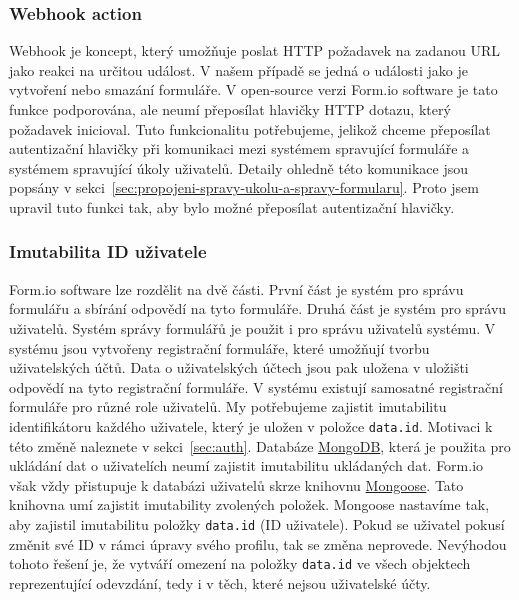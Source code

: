\subsubsection{Webhook action}\label{subsubsec:webhook-action}

Webhook je koncept, který umožňuje poslat HTTP požadavek na zadanou URL jako reakci na určitou událost.
V našem případě se jedná o události jako je vytvoření nebo smazání formuláře.
V open-source verzi Form.io software je tato funkce podporována, ale neumí přeposílat hlavičky HTTP dotazu, který požadavek inicioval.
Tuto funkcionalitu potřebujeme, jelikož chceme přeposílat autentizační hlavičky při komunikaci mezi systémem spravující formuláře a systémem spravující úkoly uživatelů.
Detaily ohledně této komunikace jsou popsány v sekci~\ref{sec:propojeni-spravy-ukolu-a-spravy-formularu}.
Proto jsem upravil tuto funkci tak, aby bylo možné přeposílat autentizační hlavičky.

\subsubsection{Imutabilita ID uživatele}\label{subsubsec:imutabilita-id-uzivatele}

Form.io software lze rozdělit na dvě části.
První část je systém pro správu formulářu a sbírání odpovědí na tyto formuláře.
Druhá část je systém pro správu uživatelů.
Systém správy formulářů je použit i pro správu uživatelů systému.
V systému jsou vytvořeny registrační formuláře, které umožňují tvorbu uživatelských účtů.
Data o uživatelských účtech jsou pak uložena v uložišti odpovědí na tyto registrační formuláře.
V systému existují samosatné registrační formuláře pro různé role uživatelů.
My potřebujeme zajistit imutabilitu identifikátoru každého uživatele, který je uložen v položce \lstinline{data.id}.
Motivaci k této změně naleznete v sekci~\ref{sec:auth}.
Databáze \href{https://www.mongodb.com/}{MongoDB}, která je použita pro ukládání dat o uživatelích neumí zajistit imutabilitu ukládaných dat.
Form.io však vždy přistupuje k databázi uživatelů skrze knihovnu \href{https://mongoosejs.com/}{Mongoose}.
Tato knihovna umí zajistit imutability zvolených položek.
Mongoose nastavíme tak, aby zajistil imutabilitu položky \lstinline{data.id} (ID uživatele).
Pokud se uživatel pokusí změnit své ID v rámci úpravy svého profilu, tak se změna neprovede.
Nevýhodou tohoto řešení je, že vytváří omezení na položky \lstinline{data.id} ve všech objektech reprezentující odevzdání, tedy i v těch, které nejsou uživatelské účty.

